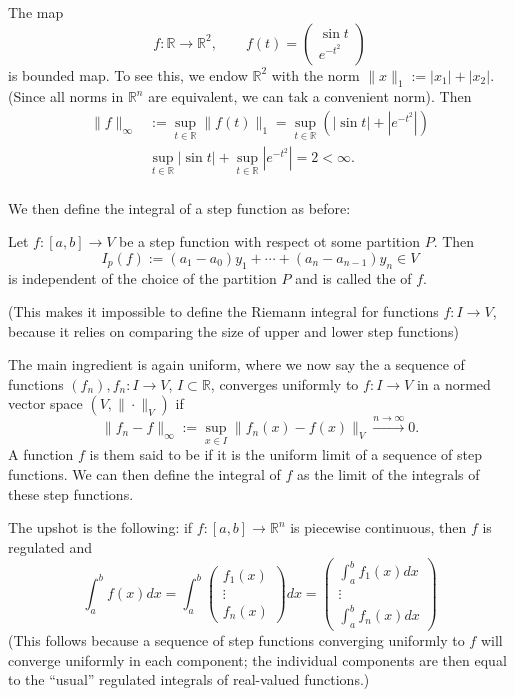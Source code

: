 \documentclass[10pt]{article}
\let\emph\relax %
\newcommand{\R}{\mathbb{R}}
\begin{document}
  \begin{example}
    The map
    \[
      f : \R \to \R^{2}, \qquad f(t) = \begin{pmatrix} 
        \sin t \\ e^{-t^{2}}
      \end{pmatrix}
    \]
    is bounded map. To see this, we endow $\R^{2}$ with the norm $\|x\|_{1} := |x_{1}| + |x_{2}|.$ 
    (Since all norms in $\R^{n}$ are equivalent, we can tak a convenient norm). Then
    \[
      \begin{aligned}
        \|f\|_{\infty} &:= \mathop{\sup}_{t \in \R}\|f(t)\|_{1} = \mathop{\sup}_{t \in \R}(|\sin t| + |e^{-t^{2}}|) \\
        & \mathop{\sup}_{t \in \R}|\sin t| + \mathop{\sup}_{t \in \R}|e^{-t^{2}}| = 2 < \infty.\\
      \end{aligned}
    \]
  \end{example}

  We then define the integral of a step function as before:
  \begin{theorem}
    Let $f : [a,b] \to V$ be a step function with respect ot some partition $P$. Then
    \[I_{p}(f) := (a_{1}-a_{0})y_{1} + \cdots + (a_{n}-a_{n-1})y_{n} \in V\]
    is independent of the choice of the partition $P$ and is called the \emph{integral} of $f$.
  \end{theorem}

  (This makes it impossible to define the Riemann integral for functions $f : I \to V$, 
  because it relies on comparing the size of upper and lower step functions)
  
  The main ingredient is again uniform, where we now say the a sequence of functions $(f_{n}), f_{n}:I \to V$,
  $I \subset \R$, converges uniformly to $f : I \to V$ in a normed vector space $(V, \|\cdot\|_{V})$ if
  \[
    \|f_{n}-f\|_{\infty} := \mathop{\sup}_{x \in I}\|f_{n}(x) - f(x)\|_{V} \xrightarrow[]{n \to \infty} 0.  
  \]
  A function $f$ is them said to be \emph{regulated} if it is the uniform limit of a sequence of step functions.
  We can then define the integral of $f$ as the limit of the integrals of these step functions.

  The upshot is the following: if $f : [a,b] \to \R^{n}$ is piecewise continuous, then $f$ is regulated and
  \[
    \int_{a}^{b}f(x)dx = \int_{a}^{b}\begin{pmatrix}
      f_{1}(x) \\ \vdots \\ f_{n}(x)
    \end{pmatrix} dx = 
    \begin{pmatrix}
      \int_{a}^{b}f_{1}(x)dx \\ \vdots \\ \int_{a}^{b}f_{n}(x)dx
    \end{pmatrix}
  \] 
  (This follows because a sequence of step functions converging uniformly to $f$ will converge uniformly in each component;
  the individual components are then equal to the ``usual'' regulated integrals of real-valued functions.)
\end{document}
